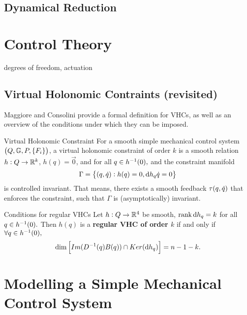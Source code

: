 \documentclass[main.tex]{subfiles}
\begin{document}
\subsection{Dynamical Reduction}
\section{Control Theory}

        degrees of freedom, actuation
\subsection{Virtual Holonomic Contraints (revisited)}\label{vhc-section}
Maggiore and Consolini provide a formal definition for VHCs, as well as an overview of the conditions under which they can be imposed\cite{maggiore2012virtual}.

\begin{boxdef}{Virtual Holonomic Constraint \cite{maggiore2012virtual}}
For a smooth simple mechanical control system $\del{Q,\mbbg,P,\cbr{F_i}}$, a virtual holonomic constraint of order $k$ is a smooth relation $h:Q\to\mathbb{R}^k$,
$h(q)=\vec{0}$, and for all $q\in h^{-1}(0),$ and the constraint manifold
\begin{align}
    \Gamma=\cbr{(q,\qd):h(q)=0,\dd h_q\qd=0}
\end{align}
is controlled invariant. That means, there exists a smooth feedback $\tau(q,\dot q)$ that enforces the constraint, such that $\Gamma$ is (asymptotically) invariant.
\end{boxdef}
\begin{boxthm}{Conditions for regular VHCs \cite{maggiore2012virtual}}
Let $h:Q\to\mathbb{R}^4$ be smooth, $\rank \dd h_q=k$ for all $q\in h^{-1}(0).$ Then $h(q)$ is a \textbf{regular VHC of order $k$} if and only if $\forall q\in h^{-1}(0),$
\begin{align}
     \dim\sbr{Im(D\inv(q)B(q))\cap Ker(\dd h_q)}=n-1-k.
\end{align}
\end{boxthm}\label{thm:regularvhc}

\section{Modelling a Simple Mechanical Control System}
\end{document}

